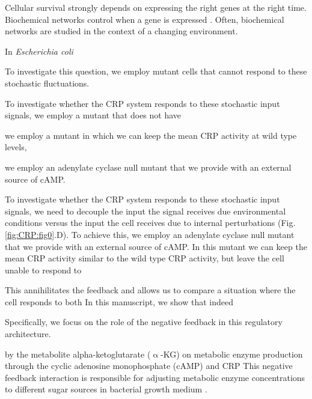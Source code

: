 Cellular survival strongly depends on expressing the right genes at the right time.
Biochemical networks control when a gene is expressed \cite{Bray1995, Alon2006, Alon2007, Tyson2010}.
%
Often, biochemical networks are studied in the context of a changing environment.
%







In \textit{Escherichia coli}





To investigate this question, we employ mutant cells that cannot respond to these stochastic fluctuations.
%



To investigate whether the CRP system responds to these stochastic input signals, 
we employ a mutant that does not have 

we employ a mutant in which we can keep the mean CRP activity at wild type levels,

we employ an adenylate cyclase null mutant that we provide with an external source of cAMP.
%





To investigate whether the CRP system responds to these stochastic input signals, 
%
we need to decouple the input the signal receives due environmental conditions versus the input the cell receives due to internal perturbations (Fig. \ref{fig:CRP:fig0}.D).
%
To achieve this,
we employ an adenylate cyclase null mutant that we provide with an external source of cAMP.
%
In this mutant we can keep the mean CRP activity similar to the wild type CRP activity, 
but leave the cell unable to respond to 


This annihilitates the feedback and allows us to compare a situation where the cell responds to both 
%
In this manuscript, we show that indeed 




Specifically, we focus on the role of the negative feedback in this regulatory architecture.


by the metabolite alpha-ketoglutarate ($\upalpha$-KG) on metabolic enzyme production through the cyclic adenosine monophosphate (cAMP) and CRP 
This negative feedback interaction is responsible for adjusting metabolic enzyme concentrations to different sugar sources in bacterial growth medium \cite{Towbin2017, Doucette2011, You2013}.


